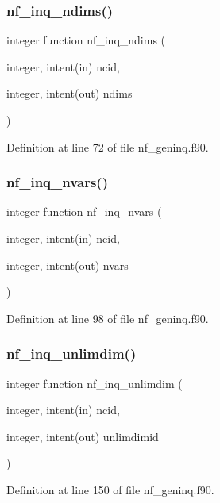 \subsubsection{\texorpdfstring{nf\+\_\+inq\+\_\+ndims()}{nf\_inq\_ndims()}}
{\footnotesize\ttfamily integer function nf\+\_\+inq\+\_\+ndims (\begin{DoxyParamCaption}\item[{integer, intent(in)}]{ncid,  }\item[{integer, intent(out)}]{ndims }\end{DoxyParamCaption})}



Definition at line 72 of file nf\+\_\+geninq.\+f90.

\mbox{\label{nf__geninq_8f90_a3bdc31be1891a17db8be6800b5368714}} 
\subsubsection{\texorpdfstring{nf\+\_\+inq\+\_\+nvars()}{nf\_inq\_nvars()}}
{\footnotesize\ttfamily integer function nf\+\_\+inq\+\_\+nvars (\begin{DoxyParamCaption}\item[{integer, intent(in)}]{ncid,  }\item[{integer, intent(out)}]{nvars }\end{DoxyParamCaption})}



Definition at line 98 of file nf\+\_\+geninq.\+f90.

\mbox{\label{nf__geninq_8f90_a37ae0d70b956662d97104cf1b836a738}} 
\subsubsection{\texorpdfstring{nf\+\_\+inq\+\_\+unlimdim()}{nf\_inq\_unlimdim()}}
{\footnotesize\ttfamily integer function nf\+\_\+inq\+\_\+unlimdim (\begin{DoxyParamCaption}\item[{integer, intent(in)}]{ncid,  }\item[{integer, intent(out)}]{unlimdimid }\end{DoxyParamCaption})}



Definition at line 150 of file nf\+\_\+geninq.\+f90.

